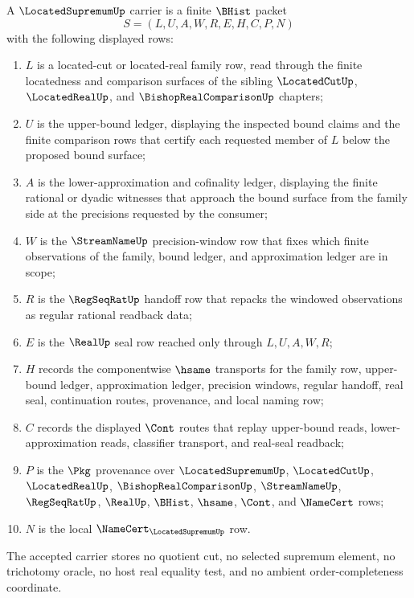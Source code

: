 \begin{definition}
\label{def:located-supremum-carrier}
A $\LocatedSupremumUp$ carrier is a finite $\BHist$ packet
$$
S=(L,U,A,W,R,E,H,C,P,N)
$$
with the following displayed rows:
\begin{enumerate}
\item $L$ is a located-cut or located-real family row, read through the finite locatedness and comparison surfaces of the sibling $\LocatedCutUp$, $\LocatedRealUp$, and $\BishopRealComparisonUp$ chapters;
\item $U$ is the upper-bound ledger, displaying the inspected bound claims and the finite comparison rows that certify each requested member of $L$ below the proposed bound surface;
\item $A$ is the lower-approximation and cofinality ledger, displaying the finite rational or dyadic witnesses that approach the bound surface from the family side at the precisions requested by the consumer;
\item $W$ is the $\StreamNameUp$ precision-window row that fixes which finite observations of the family, bound ledger, and approximation ledger are in scope;
\item $R$ is the $\RegSeqRatUp$ handoff row that repacks the windowed observations as regular rational readback data;
\item $E$ is the $\RealUp$ seal row reached only through $L,U,A,W,R$;
\item $H$ records the componentwise $\hsame$ transports for the family row, upper-bound ledger, approximation ledger, precision windows, regular handoff, real seal, continuation routes, provenance, and local naming row;
\item $C$ records the displayed $\Cont$ routes that replay upper-bound reads, lower-approximation reads, classifier transport, and real-seal readback;
\item $P$ is the $\Pkg$ provenance over $\LocatedSupremumUp$, $\LocatedCutUp$, $\LocatedRealUp$, $\BishopRealComparisonUp$, $\StreamNameUp$, $\RegSeqRatUp$, $\RealUp$, $\BHist$, $\hsame$, $\Cont$, and $\NameCert$ rows;
\item $N$ is the local $\NameCert_{\LocatedSupremumUp}$ row.
\end{enumerate}
The accepted carrier stores no quotient cut, no selected supremum element, no trichotomy oracle, no host real equality test, and no ambient order-completeness coordinate.
\end{definition}

